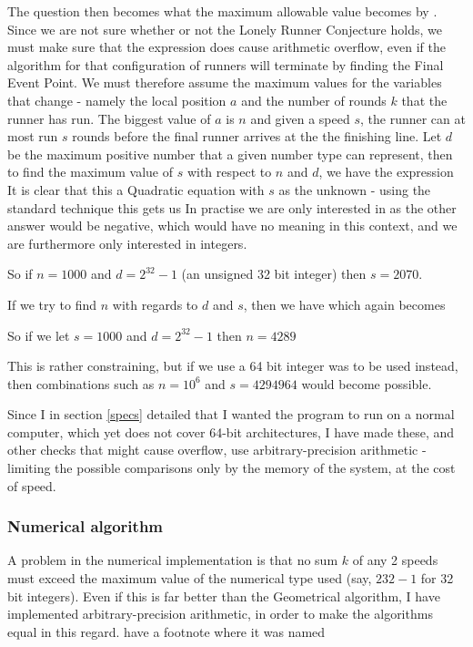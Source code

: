 {The question then becomes what the maximum allowable value becomes by . Since we are not sure whether or not the Lonely Runner Conjecture holds, we must make sure that the expression does cause arithmetic overflow, even if the algorithm for that configuration of runners will terminate by finding the Final Event Point. We must therefore assume the maximum values for the variables that change - namely the local position $a$ and the number of rounds $k$ that the runner has run. The biggest value of $a$ is $n$ and given a speed $s$, the runner can at most run $s$ rounds before the final runner arrives at the the finishing line. Let $d$ be the maximum positive number that a given number type can represent, then to find the maximum value of $s$ with respect to $n$ and $d$, we have the expression 
It is clear that this a Quadratic equation with $s$ as the unknown - using the standard technique this gets us
In practise we are only interested in
as the other answer would be negative, which would have no meaning in this context, and we are furthermore only interested in integers.

So if $n = 1000$ and $d = 2^{32}-1$ (an unsigned 32 bit integer) then $s = 2070$.

If we try to find $n$ with regards to $d$ and $s$, then we have
which again becomes

So if we let $s = 1000$ and $d = 2^{32}-1$ then $n = 4289$

This is rather constraining, but if we use a 64 bit integer was to be used instead, then combinations such as $n = 10^6$ and $s = 4294964$ would become possible.

Since I in section \ref{specs} detailed that I wanted the program to run on a normal computer, which yet does not cover 64-bit architectures, I have made these, and other checks that might cause overflow, use arbitrary-precision arithmetic - limiting the possible comparisons only by the memory of the system, at the cost of speed.

\subsubsection{Numerical algorithm}
A problem in the numerical implementation is that no sum $k$ of any 2 speeds must exceed the maximum value of the numerical type used (say, $2 {32} - 1$ for 32 bit integers). Even if this is far better than the Geometrical algorithm, I have implemented arbitrary-precision arithmetic, in order to make the algorithms equal in this regard.
have a footnote where it was named}

